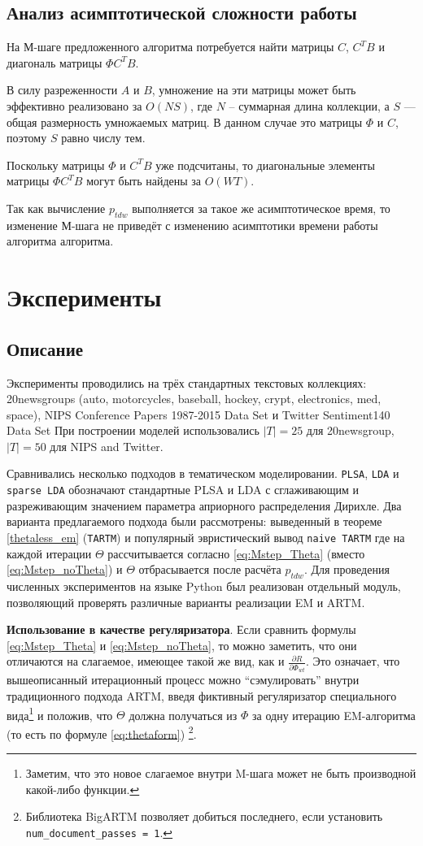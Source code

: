 \subsection{Анализ асимптотической сложности работы}
На М-шаге предложенного алгоритма потребуется найти матрицы  $C$, $C^T B$ и диагональ матрицы $\Phi C^T B$. 

В силу разреженности $A$ и $B$, умножение на эти матрицы  может быть эффективно реализовано за $O(N S)$, где $N$ -- суммарная длина коллекции, а $S$ --- общая размерность умножаемых матриц. В данном случае это матрицы $\Phi$ и $C$, поэтому $S$ равно числу тем.  

Поскольку матрицы $\Phi$ и  $C^T B$ уже подсчитаны, то диагональные элементы матрицы $\Phi C^T B$ могут быть найдены за $O(W T)$.

Так как вычисление $p_{tdw}$ выполняется за такое же асимптотическое время, то изменение М-шага не приведёт с изменению асимптотики времени работы алгоритма алгоритма.

\section{Эксперименты}
\subsection{Описание}
Эксперименты проводились на трёх стандартных текстовых коллекциях: 20newsgroups (auto,  motorcycles, baseball, hockey, crypt, electronics, med, space), NIPS Conference Papers 1987-2015 Data Set и Twitter Sentiment140 Data Set
При построении моделей использовались $\mid T\mid = 25$ для 20newsgroup, $\mid T\mid = 50$ для NIPS and Twitter.

Сравнивались несколько подходов в тематическом моделировании. \texttt{PLSA}, \texttt{LDA} и \texttt{sparse LDA} обозначают стандартные PLSA и LDA с сглаживающим и разреживающим значением параметра априорного распределения Дирихле. Два варианта предлагаемого подхода были рассмотрены: выведенный в теореме \ref{thetaless_em} (\texttt{TARTM}) и популярный эвристический вывод \texttt{naive TARTM} где на каждой итерации $\Theta$ рассчитывается согласно \eqref{eq:Mstep_Theta} (вместо \eqref{eq:Mstep_noTheta}) и $\Theta$ отбрасывается после расчёта $p_{tdw}$. Для проведения численных экспериментов на языке Python был реализован отдельный модуль, позволяющий проверять различные варианты реализации EM и ARTM. 

\textbf{Использование в качестве регуляризатора}. Если сравнить формулы \ref{eq:Mstep_Theta} и \ref{eq:Mstep_noTheta}, то можно заметить, что они отличаются на слагаемое, имеющее такой же вид, как и $\frac{\partial{R}}{\partial{\Phi_{wt}}}$. Это означает, что вышеописанный итерационный процесс можно ``сэмулировать'' внутри традиционного подхода ARTM, введя фиктивный регуляризатор специального вида\footnote{Заметим, что это новое слагаемое внутри M-шага может не быть  производной какой-либо функции.} и положив, что $\Theta$ должна получаться из $\Phi$ за одну итерацию EM-алгоритма (то есть по формуле \ref{eq:thetaform}) \footnote{Библиотека BigARTM позволяет добиться последнего, если установить \texttt{num\_document\_passes\ =\ 1}.}.


